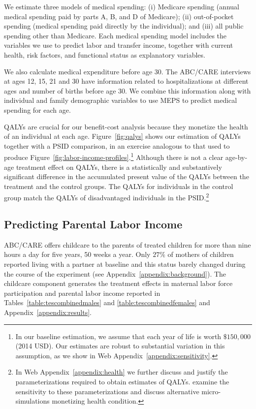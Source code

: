 We estimate three models of medical spending: (i) Medicare spending (annual medical spending paid by parts A, B, and D of Medicare); (ii) out-of-pocket spending (medical spending paid directly by the individual); and (iii) all public spending other than Medicare. Each medical spending model includes the variables we use to predict labor and transfer income, together with current health, risk factors, and functional status as explanatory variables.

We also calculate medical expenditure before age 30. The ABC/CARE interviews at ages 12, 15, 21 and 30 have information related to hospitalizations at different ages and number of births before age 30. We combine this information along with individual and family demographic variables to use MEPS to predict medical spending for each age.

QALYs are crucial for our benefit-cost analysis because they monetize the health of an individual at each age. Figure~\ref{fig:qalys} shows our estimation of QALYs together with a PSID comparison, in an exercise analogous to that used to produce Figure~\ref{fig:labor-income-profiles}.\footnote{In our baseline estimation, we assume that each year of life is worth  $\$150,000$ (2014 USD). Our estimates are robust to substantial variation in this assumption, as we show in Web Appendix~\ref{appendix:sensitivity}.} Although there is not a clear age-by-age treatment effect on QALYs, there is a statistically and substantively significant difference in the accumulated present value of the QALYs between the treatment and the control groups. The QALYs for individuals in the control group match the QALYs of disadvantaged individuals in the PSID.\footnote{In Web Appendix~\ref{appendix:health} we further discuss and justify the parameterizations required to obtain estimates of QALYs. \citet{Goldman_etal_2015_Future-America-Model} examine the sensitivity to these parameterizations and discuss alternative micro-simulations monetizing health condition.}

\subsection{Predicting Parental Labor Income} \label{section:pincome}

ABC/CARE offers childcare to the parents of treated children for more than nine hours a day for five years, 50 weeks a year. Only $27\%$ of mothers of children reported living with a partner at baseline and this status barely changed during the course of the experiment (see Appendix~\ref{appendix:background}). The childcare component generates the treatment effects in maternal labor force participation and parental labor income reported in Tables~\ref{table:tescombinedmales} and \ref{table:tescombinedfemales} and Appendix~\ref{appendix:results}.

